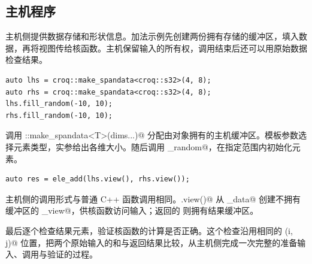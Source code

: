 \subsection*{主机程序}

主机侧提供数据存储和形状信息。加法示例先创建两份拥有存储的缓冲区，填入数据，再将视图传给核函数。主机保留输入的所有权，调用结束后还可以用原始数据检查结果。

\begin{lstlisting}[language=croqtile,caption={创建带形状的输入}]
auto lhs = croq::make_spandata<croq::s32>(4, 8);
auto rhs = croq::make_spandata<croq::s32>(4, 8);
lhs.fill_random(-10, 10);
rhs.fill_random(-10, 10);
\end{lstlisting}

调用 \co@croq::make_spandata<T>(dims...)@ 分配由对象拥有的主机缓冲区。模板参数选择元素类型，实参给出各维大小。随后调用 \co@fill_random@，在指定范围内初始化元素。

\begin{lstlisting}[language=croqtile,caption={调用核函数}]
auto res = ele_add(lhs.view(), rhs.view());
\end{lstlisting}

主机侧的调用形式与普通 C++ 函数调用相同。\co@.view()@ 从 \co@spanned_data@ 创建不拥有缓冲区的 \co@spanned_view@，供核函数访问输入；返回的 \co@res@ 则拥有结果缓冲区。

\co@main@ 最后逐个检查结果元素，验证核函数的计算是否正确。这个检查沿用相同的 \co@(i, j)@ 位置，把两个原始输入的和与返回结果比较，从主机侧完成一次完整的准备输入、调用与验证的过程。
